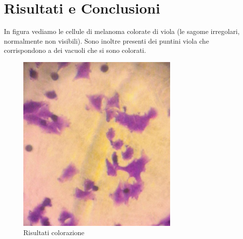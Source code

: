 \section{Risultati e Conclusioni}

In figura vediamo le cellule di melanoma colorate di viola (le sagome irregolari, normalmente non visibili).
Sono inoltre presenti dei puntini viola che corrispondono a dei vacuoli che si sono colorati.

\begin{figure}[htbp]
	\centering
	\includegraphics[width=80mm]{./immagini/melanoma.png}
	\caption{Risultati colorazione}
	\label{melanoma}
\end{figure}
